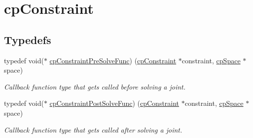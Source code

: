\hypertarget{group__cp_constraint}{}\section{cp\+Constraint}
\label{group__cp_constraint}
\subsection*{Typedefs}
\begin{DoxyCompactItemize}
\item 
\mbox{\label{group__cp_constraint_gaf6038a155d58f45d6ab977dd1b1398de}} 
typedef void($\ast$ \mbox{\hyperlink{group__cp_constraint_gaf6038a155d58f45d6ab977dd1b1398de}{cp\+Constraint\+Pre\+Solve\+Func}}) (\mbox{\hyperlink{structcp_constraint}{cp\+Constraint}} $\ast$constraint, \mbox{\hyperlink{structcp_space}{cp\+Space}} $\ast$space)
\begin{DoxyCompactList}\small\item\em Callback function type that gets called before solving a joint. \end{DoxyCompactList}\item 
\mbox{\label{group__cp_constraint_ga2208378297a7265d0cc69f31697961b9}} 
typedef void($\ast$ \mbox{\hyperlink{group__cp_constraint_ga2208378297a7265d0cc69f31697961b9}{cp\+Constraint\+Post\+Solve\+Func}}) (\mbox{\hyperlink{structcp_constraint}{cp\+Constraint}} $\ast$constraint, \mbox{\hyperlink{structcp_space}{cp\+Space}} $\ast$space)
\begin{DoxyCompactList}\small\item\em Callback function type that gets called after solving a joint. \end{DoxyCompactList}\end{DoxyCompactItemize}

